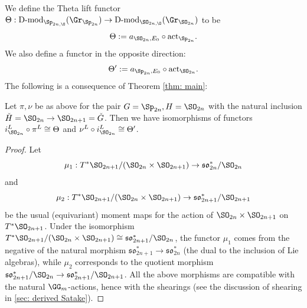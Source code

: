 \documentclass[11pt]{article}
\begin{document}
We define the Theta lift functor $\Theta:\operatorname{D-mod}_{\Sp_{2n,\O}}(\Gr_{\Sp_{2n}}) \to \operatorname{D-mod}_{\SO_{2n,\O}}(\Gr_{\SO_{2n}})$ to be $$\Theta:=a_{\SO_{2n},E_0}\circ \mathrm{act}_{\Sp_{2n}}.$$
We also define a functor in the opposite direction:
$$\Theta':=a_{\Sp_{2n},E_0}\circ \mathrm{act}_{\SO_{2n}}.$$
The following is a consequence of Theorem \ref{thm: main}:
\begin{theorem}
    Let $\pi,\nu$ be as above for the pair $G=\Sp_{2n}, H=\SO_{2n}$ with the natural inclusion $\check{H}=\SO_{2n}\to \SO_{2n+1}=\check{G}$. Then we have isomorphisms of functors $i_{\SO_{2n}}^L\circ \pi^L\cong \Theta$ and $\nu^L\circ i_{\SO_{2n}}^L\cong \Theta'$.
\end{theorem}
\begin{proof}
    Let $$\mu_1:T^*\SO_{2n+1} / (\SO_{2n}\times \SO_{2n+1})\to \mathfrak{so}^*_{2n} / \SO_{2n}$$ and $$\mu_2:T^*\SO_{2n+1} / (\SO_{2n}\times \SO_{2n+1})\to \mathfrak{so}^*_{2n+1} / \SO_{2n+1}$$ be the usual (equivariant) moment maps for the action of $\SO_{2n}\times \SO_{2n+1}$ on $T^*\SO_{2n+1}$.
    Under the isomorphism $T^*\SO_{2n+1} / (\SO_{2n}\times \SO_{2n+1})\cong \mathfrak{so}^*_{2n+1} / \SO_{2n}$, the functor $\mu_1$ comes from the negative of the natural morphism $\mathfrak{so}^*_{2n+1}\to \mathfrak{so}^*_{2n}$ (the dual to the inclusion of Lie algebras), while $\mu_2$ corresponds to the quotient morphism $\mathfrak{so}^*_{2n+1} / \SO_{2n}\to \mathfrak{so}^*_{2n+1} / \SO_{2n+1}$.
    All the above morphisms are compatible with the natural $\GG_m$-actions, hence with the shearings (see the discussion of shearing in \ref{sec: derived Satake}).


\end{proof}
\end{document}
